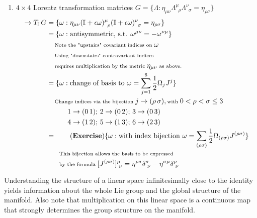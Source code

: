 \begin{enumerate}
\item $4 \times 4$ Lorentz transformation matrices $G = \{ \Lambda : \eta_{\mu\nu} \Lambda^\mu_{\,\,\,\rho} \Lambda^\nu_{\,\,\,\sigma} = \eta_{\rho\sigma} \}$ 
\subitem \begin{align*}
\rightarrow T_{\mathbb{I}} \, G &= \{ \omega : \eta_{\mu\nu} (\mathbb{I} + \epsilon \omega)^\mu_{\,\,\,\rho} (\mathbb{I} + \epsilon \omega)^\nu_{\,\,\,\sigma} = \eta_{\rho\sigma} \} \\
&= \{ \omega : \text{antisymmetric, s.t. } \omega^{\mu\nu} = -\omega^{\nu\mu} \} \\
&\,\,\,\,\,\,\, {\scriptsize \text{Note the "upstairs" covariant indices on }} \omega \\
&\,\,\,\,\,\,\, {\scriptsize \text{Using "downstairs" contravariant indices}} \\ 
&\,\,\,\,\,\,\, {\scriptsize \text{requires multiplication by the metric } \eta_{\mu\nu} \text{ as above.}} \\
&= \{ \omega : \text{change of basis to } \omega = \sum_{j=1}^6 \frac{1}{2} \Omega_j J^j \} \\
&\,\,\,\,\,\,\, {\scriptsize \text{Change indices via the bijection } j \rightarrow (\rho \, \sigma), \text{with } 0<\rho<\sigma\le 3 } \\
&\,\,\,\,\,\,\,\,\,\,\,\,\,\,\,\,\,\, 1 \rightarrow (0 \, 1); \, 2 \rightarrow (0 \, 2); \, 3 \rightarrow (0 \, 3) \\
&\,\,\,\,\,\,\,\,\,\,\,\,\,\,\,\,\,\, 4 \rightarrow (1 \, 2); \, 5 \rightarrow (1 \, 3); \, 6 \rightarrow (2 \, 3) \\
&= \tag{\textbf{Exercise}} \{ \omega : \text{with index bijection } \omega = \sum_{(\rho\sigma)} \frac{1}{2} \Omega_{(\rho\sigma)}  J^{(\rho\sigma)}  \} \\
&\,\,\,\,\,\,\,\,\,\,\, {\scriptsize \text{This bijection allows the basis to be expressed }}  \\
&\,\,\,\,\,\,\,\,\,\,\, {\scriptsize \text{by the formula } [J^{(\rho\sigma)}]^\mu_{\,\,\nu} = \eta^{\rho\sigma} \delta^{\sigma}_{\,\,\nu} - \eta^{\sigma\mu} \delta^{\rho}_{\,\,\nu}} \\
\end{align*}
\end{enumerate}

\noindent Understanding the structure of a linear space infinitesimally close to the identity yields information about the whole Lie group and the global structure of the manifold. Also note that multiplication on this linear space is a continuous map that strongly determines the group structure on the manifold. \\

